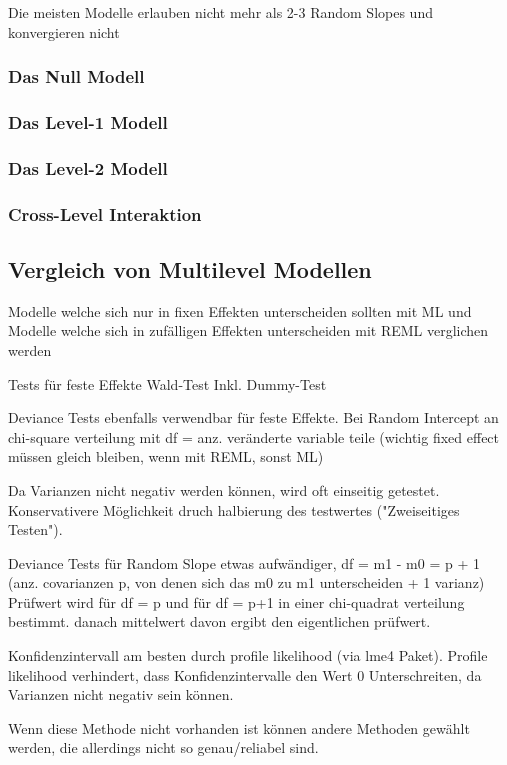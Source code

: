 \documentclass[12pt]{article}\usepackage[]{graphicx}\usepackage[]{color}
\begin{document}
Die meisten Modelle erlauben nicht mehr als 2-3 Random Slopes und konvergieren nicht \cite{SnijdersTomA.B2012Ma:a}


\subsubsection{Das Null Modell}
\subsubsection{Das Level-1 Modell}
\subsubsection{Das Level-2 Modell}
\subsubsection{Cross-Level Interaktion}

\subsection{Vergleich von Multilevel Modellen}
Modelle welche sich nur in fixen Effekten unterscheiden sollten mit ML und Modelle welche sich in zufälligen Effekten unterscheiden mit REML verglichen werden \cite{SnijdersTomA.B2012Ma:a}

Tests für feste Effekte Wald-Test \cite{SnijdersTomA.B2012Ma:a} Inkl. Dummy-Test

Deviance Tests ebenfalls verwendbar für feste Effekte. Bei Random Intercept an chi-square verteilung mit df = anz. veränderte variable teile (wichtig fixed effect müssen gleich bleiben, wenn mit REML, sonst ML)

Da Varianzen nicht negativ werden können, wird oft einseitig getestet. Konservativere Möglichkeit druch halbierung des testwertes ("Zweiseitiges Testen").


Deviance Tests für Random Slope etwas aufwändiger, df = m1 - m0 = p + 1 (anz. covarianzen p, von denen sich das m0 zu m1 unterscheiden + 1 varianz) Prüfwert wird für df = p und für df = p+1 in einer chi-quadrat verteilung bestimmt. danach mittelwert davon ergibt den eigentlichen prüfwert. 

Konfidenzintervall am besten durch profile likelihood (via lme4 Paket). Profile likelihood verhindert, dass Konfidenzintervalle den Wert 0 Unterschreiten, da Varianzen nicht negativ sein können. 

Wenn diese Methode nicht vorhanden ist können andere Methoden gewählt werden, die allerdings nicht so genau/reliabel sind.
\end{document}
